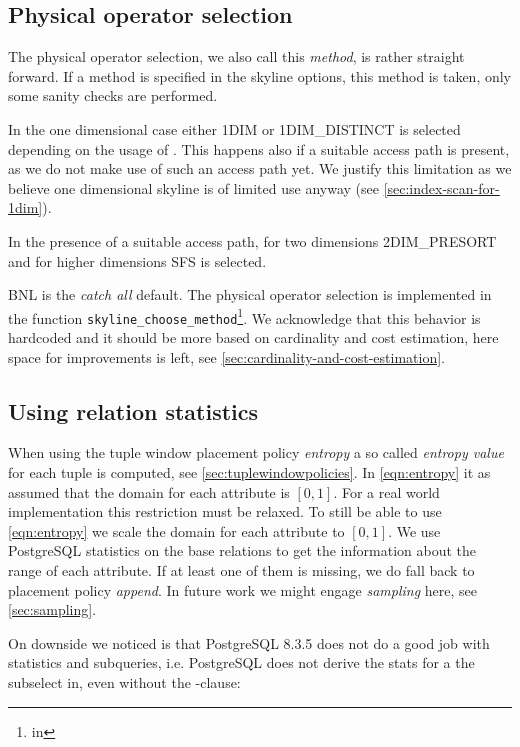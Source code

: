 \subsection{Physical operator selection}
\label{sec:operatorselection}
The physical operator selection, we also call this \emph{method}, is
rather straight forward.  If a method is specified in the skyline options,
this method is taken, only some sanity checks are performed.  

In the one dimensional case either 1DIM or 1DIM\_DISTINCT is selected
depending on the usage of .  This
happens also if a suitable access path is present, as we do not make
use of such an access path yet.  We justify this limitation as we
believe one dimensional skyline is of limited use anyway (see
\autoref{sec:index-scan-for-1dim}).

In the presence of a suitable access path, for two dimensions
2DIM\_PRESORT and for higher dimensions SFS is selected.

BNL is the \emph{catch all} default. The physical operator selection
is implemented in the function \texttt{skyline\_choose\_method}\footnote{in
}.  We acknowledge that
this behavior is hardcoded and it should be more based on cardinality
and cost estimation, here space for improvements is left, see
\autoref{sec:cardinality-and-cost-estimation}.


\subsection{Using relation statistics}
\label{sec:using-relation-statistics}
When using the tuple window placement policy \emph{entropy} a so
called \emph{entropy value} for each tuple is computed, see
\autoref{sec:tuplewindowpolicies}.
In \eqref{eqn:entropy} it as assumed that the domain for each
attribute is $[0, 1]$.  For a real world implementation this
restriction must be relaxed.  To still be able to use
\eqref{eqn:entropy} we scale the domain for each attribute to $[0,
1]$.  We use PostgreSQL statistics on the base relations to get the
information about the range of each attribute.  If at least one of
them is missing, we do fall back to placement policy \emph{append}.  In
future work we might engage \emph{sampling} here, see
\autoref{sec:sampling}.

On downside we noticed is that PostgreSQL 8.3.5 does not do a good job
with statistics and subqueries, i.e. PostgreSQL does not derive the
stats for a the subselect in, even without the
-clause:

